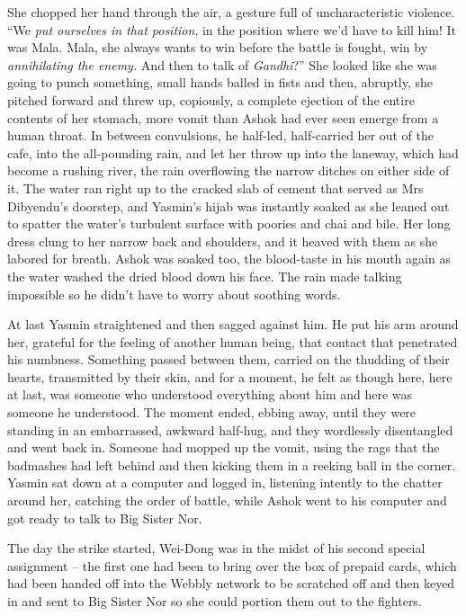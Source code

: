She chopped her hand through the air, a gesture full of
uncharacteristic violence. ``We
\emph{put ourselves in that position}, in the position where we'd
have to kill him! It was Mala. Mala, she always wants to win before
the battle is fought, win by \emph{annihilating the enemy.} And
then to talk of \emph{Gandhi}?'' She looked like she was going to
punch something, small hands balled in fists and then, abruptly,
she pitched forward and threw up, copiously, a complete ejection of
the entire contents of her stomach, more vomit than Ashok had ever
seen emerge from a human throat. In between convulsions, he
half-led, half-carried her out of the cafe, into the all-pounding
rain, and let her throw up into the laneway, which had become a
rushing river, the rain overflowing the narrow ditches on either
side of it. The water ran right up to the cracked slab of cement
that served as Mrs Dibyendu's doorstep, and Yasmin's hijab was
instantly soaked as she leaned out to spatter the water's turbulent
surface with poories and chai and bile. Her long dress clung to her
narrow back and shoulders, and it heaved with them as she labored
for breath. Ashok was soaked too, the blood-taste in his mouth
again as the water washed the dried blood down his face. The rain
made talking impossible so he didn't have to worry about soothing
words.

At last Yasmin straightened and then sagged against him. He put his
arm around her, grateful for the feeling of another human being,
that contact that penetrated his numbness. Something passed between
them, carried on the thudding of their hearts, transmitted by their
skin, and for a moment, he felt as though here, here at last, was
someone who understood everything about him and here was someone he
understood. The moment ended, ebbing away, until they were standing
in an embarrassed, awkward half-hug, and they wordlessly
disentangled and went back in. Someone had mopped up the vomit,
using the rags that the badmashes had left behind and then kicking
them in a reeking ball in the corner. Yasmin sat down at a computer
and logged in, listening intently to the chatter around her,
catching the order of battle, while Ashok went to his computer and
got ready to talk to Big Sister Nor.

\tb

The day the strike started, Wei-Dong was in the midst of his second
special assignment -- the first one had been to bring over the box
of prepaid cards, which had been handed off into the Webbly network
to be scratched off and then keyed in and sent to Big Sister Nor so
she could portion them out to the fighters.

